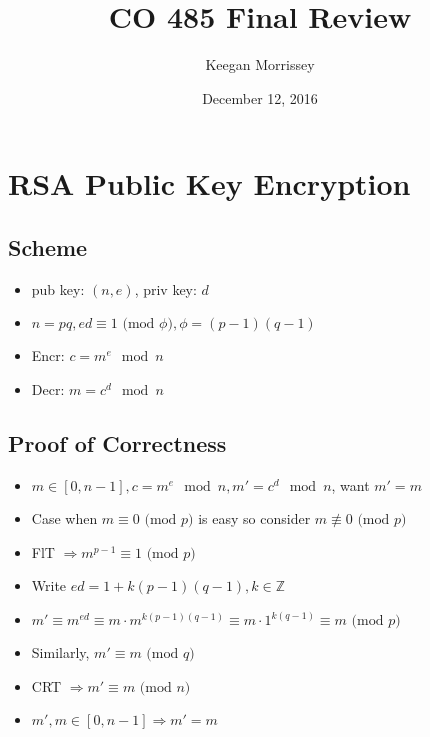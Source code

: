 \documentclass[12pt]{article}
\newcommand{\Z}{\mathbb{Z}}
\newcommand{\I}{\Rightarrow}
\newcommand{\modd}[1]{\text{ (mod } #1\text{)}}
\begin{document}
 
 
\title{CO 485 Final Review}
\author{Keegan Morrissey}
\date{December 12, 2016}
\maketitle

\section{RSA Public Key Encryption}
\subsection{Scheme}

\begin{itemize}
\item pub key: $(n,e)$, priv key: $d$
\item $n = pq, ed \equiv 1 \modd \phi, \phi = (p-1)(q-1)$
\item Encr: $c = m^e \mod n$
\item Decr: $m = c^d \mod n$
\end{itemize}

\subsection{Proof of Correctness}

\begin{itemize}
\item $m \in [0,n-1], c = m^e \mod n, m' = c^d \mod n$, want $m' = m$
\item Case when $m \equiv 0 \modd p$ is easy so consider $m \not\equiv 0 \modd p$
\item FlT $\I m^{p-1} \equiv 1 \modd p$
\item Write $ed = 1 + k(p-1)(q-1), k \in \Z$
\item $m' \equiv m^{ed} \equiv m\cdot m^{k(p-1)(q-1)} \equiv m\cdot 1^{k(q-1)} \equiv m \modd p$
\item Similarly, $m' \equiv m \modd q$
\item CRT $\I m' \equiv m \modd n$
\item $m',m \in [0,n-1] \I m' = m$
\end{itemize}
\end{document}

